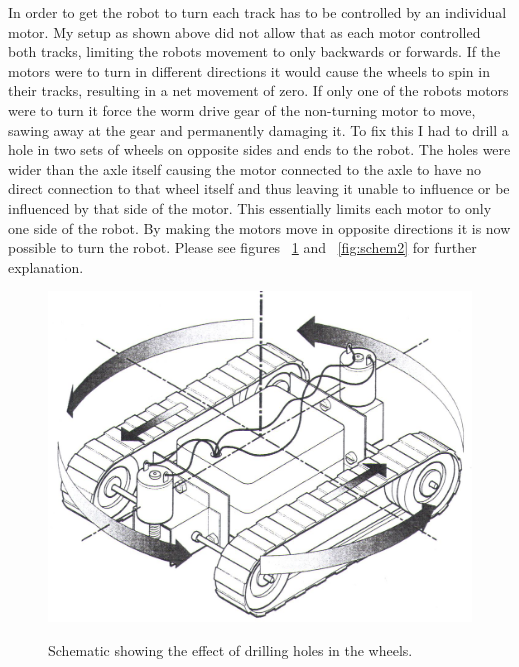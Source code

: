 \documentclass[]{report}   %
\begin{document}
						In order to get the robot to turn each track has to be controlled by an individual motor. My setup as shown above did not allow that as
						each motor controlled both tracks, limiting the robots movement to only backwards or forwards. If the motors were to turn in different
						directions it would cause the wheels to spin in their tracks, resulting in a net movement of zero. If only one of the robots motors were to turn it
						force the worm drive gear of the non-turning motor to move, sawing away at the gear and permanently damaging it. To fix this I had to
						drill a hole in two sets of wheels on opposite sides and ends to the robot. The holes were wider than the axle itself causing the motor
						connected to the axle to have no direct connection to that wheel itself and thus leaving it unable to influence or be influenced by that
						side of the motor. This essentially limits each motor to only one side of the robot. By making the motors move in opposite directions it
						is now possible to turn the robot. Please see figures ~\ref{fig:schem1} and ~\ref{fig:schem2} for further explanation.
						
						\begin{figure}[h]
							\caption{Schematic showing the effect of drilling holes in the wheels. \cite{roverschem}}
							\includegraphics[width=\textwidth, height=\textheight, keepaspectratio]{images/scem1}
							\label{fig:schem1}
						\end{figure}
						
\end{document}
